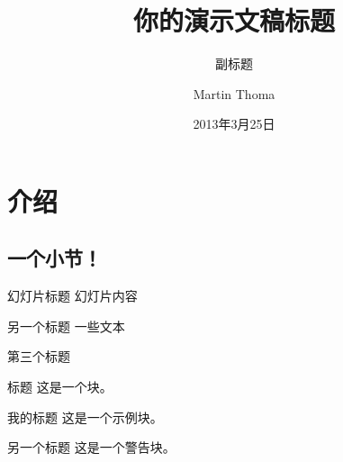 \documentclass{beamer}
\begin{document}
\title{你的演示文稿标题}
\subtitle{副标题}
\author{Martin Thoma}
\date{2013年3月25日}
\subject{计算机科学}

\frame{\titlepage}



\section{介绍}
\subsection{一个小节！}
\begin{frame}{幻灯片标题}
    幻灯片内容
\end{frame}

\begin{frame}{另一个标题}
    一些文本\\
\end{frame}

\begin{frame}{第三个标题}
    \begin{block}{标题}
        这是一个块。
    \end{block}

    \begin{exampleblock}{我的标题}
        这是一个示例块。
    \end{exampleblock}

    \begin{alertblock}{另一个标题}
        这是一个警告块。
    \end{alertblock}
\end{frame}
\end{document}
